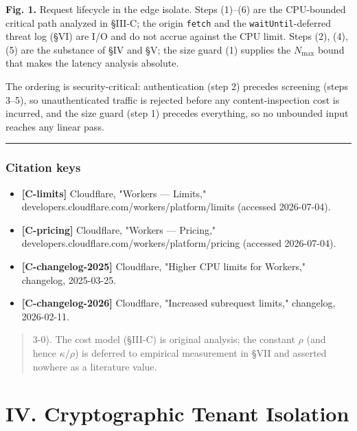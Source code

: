 \textbf{Fig. 1.} Request lifecycle in the edge isolate. Steps (1)--(6)
are the CPU-bounded critical path analyzed in §III-C; the origin
\passthrough{\lstinline!fetch!} and the
\passthrough{\lstinline!waitUntil!}-deferred threat log (§VI) are I/O
and do not accrue against the CPU limit. Steps (2), (4), (5) are the
substance of §IV and §V; the size guard (1) supplies the \(N_{\max}\)
bound that makes the latency analysis absolute.

The ordering is security-critical: authentication (step 2) precedes
screening (steps 3--5), so unauthenticated traffic is rejected before
any content-inspection cost is incurred, and the size guard (step 1)
precedes everything, so no unbounded input reaches any linear pass.

\begin{center}\rule{0.5\linewidth}{0.5pt}\end{center}

\subsubsection{Citation keys}\label{citation-keys-1}

\begin{itemize}
\tightlist
\item
  \textbf{{[}C-limits{]}} Cloudflare, "Workers --- Limits,"
  developers.cloudflare.com/workers/platform/limits (accessed
  2026-07-04).
\item
  \textbf{{[}C-pricing{]}} Cloudflare, "Workers --- Pricing,"
  developers.cloudflare.com/workers/platform/pricing (accessed
  2026-07-04).
\item
  \textbf{{[}C-changelog-2025{]}} Cloudflare, "Higher CPU limits for
  Workers," changelog, 2025-03-25.
\item
  \textbf{{[}C-changelog-2026{]}} Cloudflare, "Increased subrequest
  limits," changelog, 2026-02-11.
\end{itemize}

\begin{quote}
3-0). The cost model (§III-C) is original analysis; the constant
\(\rho\) (and hence \(\kappa/\rho\)) is deferred to empirical
measurement in §VII and asserted nowhere as a literature value.
\end{quote}

\section{IV. Cryptographic Tenant
Isolation}\label{iv-cryptographic-tenant-isolation}

